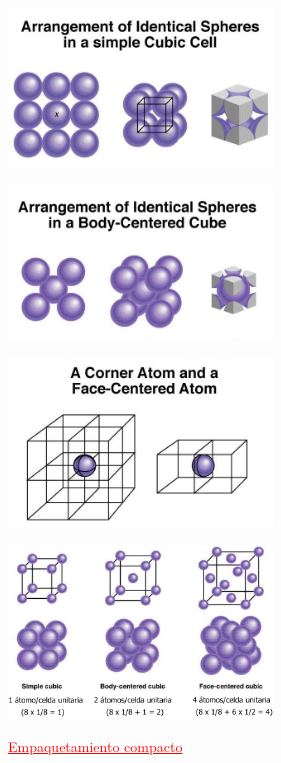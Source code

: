             \begin{center} \includegraphics[width=7cm]{./imagenes/celdaCubicaSimple.png} \end{center}
            \begin{center} \includegraphics[width=7cm]{./imagenes/celdaCubicaCentradaEnElCuerpo.png} \end{center}
            \begin{center} \includegraphics[width=7cm]{./imagenes/distribucionAtomosVerticeYCaraCeldaUnitaria.png} \end{center}
            \begin{center} \includegraphics[width=7cm]{./imagenes/atomosEnCeldasUnitarias.png} \end{center}
            \begin{center} \textcolor{red}{\underline{Empaquetamiento compacto}} \end{center}
